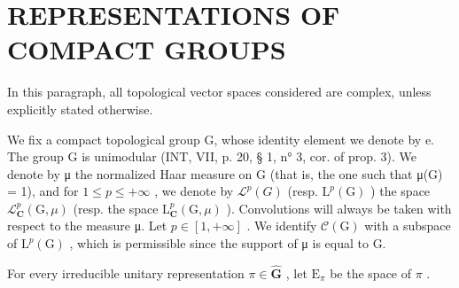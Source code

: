 \section{REPRESENTATIONS OF COMPACT GROUPS}

In this paragraph, all topological vector spaces considered are complex, unless explicitly stated otherwise.

We fix a compact topological group G, whose identity element we denote by e. The group G is unimodular (INT, VII, p. 20, § 1, n° 3, cor. of prop. 3). We denote by μ the normalized Haar measure on G (that is, the one such that μ(G) = 1), and for \(1 \leqslant p \leqslant +\infty\) , we denote by \(\mathcal{L}^{p}(G)\) (resp. \(\mathrm{L}^{p}(\mathrm{G})\) ) the space \(\mathcal{L}_{\mathbf{C}}^{p}(\mathrm{G}, \mu)\) (resp. the space \(\mathrm{L}_{\mathbf{C}}^{p}(\mathrm{G}, \mu)\) ). Convolutions will always be taken with respect to the measure μ. Let \(p \in [1, +\infty]\) . We identify \(\mathcal{C}(\mathrm{G})\) with a subspace of \(\mathrm{L}^{p}(\mathrm{G})\) , which is permissible since the support of μ is equal to G.

For every irreducible unitary representation \(\pi \in \widehat{\mathbf{G}}\) , let \(\mathrm{E}_{\pi}\) be the space of \(\pi\) .

